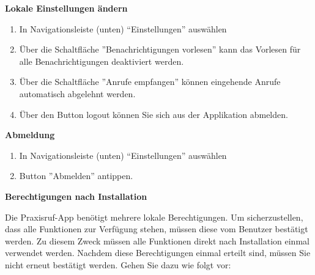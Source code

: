 \textbf{Lokale Einstellungen ändern}
\begin{enumerate}
    \item In Navigationsleiste (unten) ``Einstellungen'' auswählen
    \item Über die Schaltfläche ''Benachrichtigungen vorlesen'' kann das Vorlesen für alle Benachrichtigungen deaktiviert werden.
    \item Über die Schaltfläche ''Anrufe empfangen'' können eingehende Anrufe automatisch abgelehnt werden.
    \item Über den Button logout können Sie sich aus der Applikation abmelden.
\end{enumerate}

\textbf{Abmeldung}

\begin{enumerate}
    \item In Navigationsleiste (unten) ``Einstellungen'' auswählen
    \item Button ''Abmelden'' antippen.
\end{enumerate}

\textbf{Berechtigungen nach Installation}

Die Praxisruf-App benötigt mehrere lokale Berechtigungen.
Um sicherzustellen, dass alle Funktionen zur Verfügung stehen, müssen diese vom Benutzer bestätigt werden.
Zu diesem Zweck müssen alle Funktionen direkt nach Installation einmal verwendet werden.
Nachdem diese Berechtigungen einmal erteilt sind, müssen Sie nicht erneut bestätigt werden.
Gehen Sie dazu wie folgt vor:

